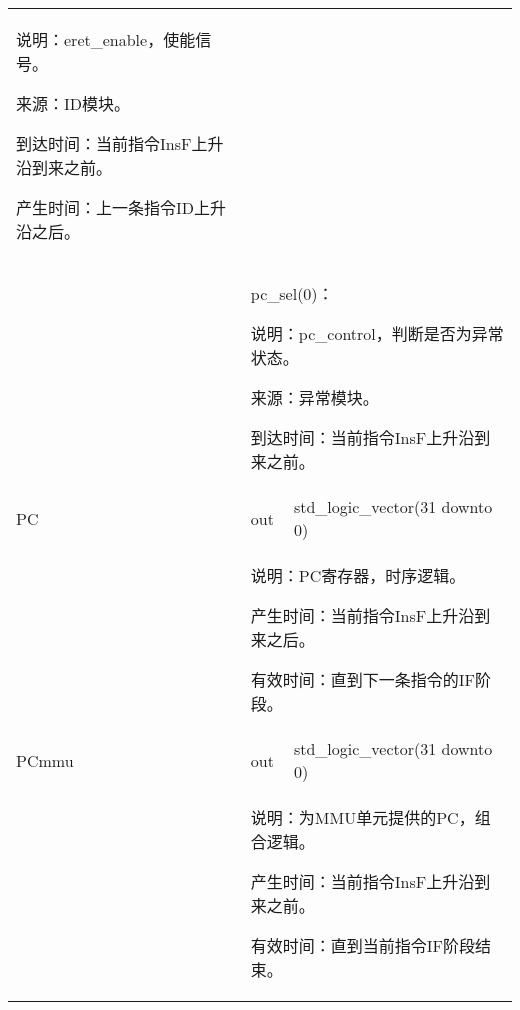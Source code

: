 \begin{tabularx}{\textwidth}{lll}
{                    说明：eret\_enable，使能信号。

                    来源：ID模块。

                    到达时间：当前指令InsF上升沿到来之前。

                    产生时间：上一条指令ID上升沿之后。
            } \\
            &
            \multicolumn{2}{X}{
                pc\_sel(0)：

                    说明：pc\_control，判断是否为异常状态。

                    来源：异常模块。

                    到达时间：当前指令InsF上升沿到来之前。
            } \\
            \midrule
            PC              & out       & std\_logic\_vector(31 downto 0) \\
            \cmidrule(l){2-3}
            &
            \multicolumn{2}{X}{
                说明：PC寄存器，时序逻辑。

                产生时间：当前指令InsF上升沿到来之后。

                有效时间：直到下一条指令的IF阶段。
            } \\
            \midrule
            PCmmu           & out       & std\_logic\_vector(31 downto 0) \\
            \cmidrule(l){2-3}
            &
            \multicolumn{2}{X}{
                说明：为MMU单元提供的PC，组合逻辑。

                产生时间：当前指令InsF上升沿到来之前。

                有效时间：直到当前指令IF阶段结束。
            } \\
            \bottomrule
        \end{tabularx}
